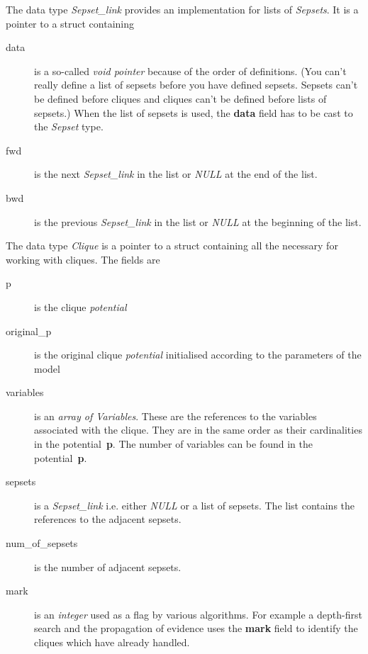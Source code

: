 \documentclass[12pt,a4paper]{report}
\begin{document}
The data type {\it Sepset\_link} provides an implementation for lists
of {\it Sepsets}. It is a pointer to a struct containing
\begin{description}
\item[data] is a so-called {\it void pointer} because of the order of
definitions. (You can't really define a list of sepsets before you
have defined sepsets. Sepsets can't be defined before cliques and
cliques can't be defined before lists of sepsets.) When the list of
sepsets is used, the \textbf{data} field has to be cast to the 
{\it Sepset} type. 

\item[fwd] is the next {\it Sepset\_link} in the list or {\it NULL} at
the end of the list.

\item[bwd] is the previous {\it Sepset\_link} in the list or 
{\it NULL} at the beginning of the list.

\end{description}

The data type {\it Clique} is a pointer to a struct containing all the
necessary for working with cliques. The fields are
\begin{description}
\item[p] is the clique {\it potential}

\item[original\_p] is the original clique {\it potential} initialised
according to the parameters of the model

\item[variables] is an {\it array of Variables}. These are the
references to the variables associated with the clique. They are in
the same order as their cardinalities in the potential~\textbf{p}.
The number of variables can be found in the potential~\textbf{p}.

\item[sepsets] is a {\it Sepset\_link} i.e. either {\it NULL} or a
list of sepsets. The list contains the references to the adjacent sepsets.

\item[num\_of\_sepsets] is the number of adjacent sepsets.

\item[mark] is an {\it integer} used as a flag by various algorithms. For
example a depth-first search and the propagation of evidence uses the 
\textbf{mark} field to identify the cliques which have already handled.

\end{description}
\end{document}
